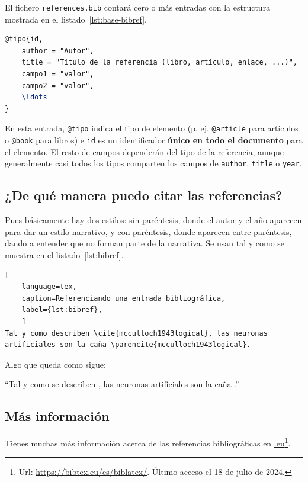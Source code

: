 \documentclass[%
    school=etsisi,%
    type=pfg,%
    degree=61CD,%
]{upm-report}
\begin{document}
El fichero \texttt{references.bib} contará cero o más entradas con la estructura mostrada en el listado~\ref{lst:base-bibref}.

\begin{lstlisting}[language=tex,caption=Estructura general de una referencia,label=lst:base-bibref]
@tipo{id,
    author = "Autor",
    title = "Título de la referencia (libro, artículo, enlace, ...)",
    campo1 = "valor",
    campo2 = "valor",
    \ldots
}
\end{lstlisting}

En esta entrada, \texttt{@tipo} indica el tipo de elemento (p. ej.
\texttt{@article} para artículos o \texttt{@book} para libros) e
\texttt{id} es un identificador \textbf{único en todo el documento} para
el elemento. El resto de campos dependerán del tipo de la referencia,
aunque generalmente casi todos los tipos comparten los campos de
\texttt{author}, \texttt{title} o \texttt{year}.

\subsection{¿De qué manera puedo citar las referencias?}

Pues básicamente hay dos estilos: sin paréntesis, donde el autor y el
año aparecen para dar un estilo narrativo, y con paréntesis, donde
aparecen entre paréntesis, dando a entender que no forman parte de la
narrativa. Se usan tal y como se muestra en el listado~\ref{lst:bibref}.

\begin{lstlisting}[
    language=tex,
    caption=Referenciando una entrada bibliográfica,
    label={lst:bibref},
    ]
Tal y como describen \cite{mcculloch1943logical}, las neuronas
artificiales son la caña \parencite{mcculloch1943logical}.
\end{lstlisting}

Algo que queda como sigue:

\enquote{Tal y como se describen \cite{mcculloch1943logical}, las
neuronas artificiales son la caña \parencite{mcculloch1943logical}.}

\subsection{Más información}

Tienes muchas más información acerca de las referencias bibliográficas
en \href{https://bibtex.eu/es/biblatex/}{.eu}\footnote{
Url: \url{https://bibtex.eu/es/biblatex/}. Último acceso el 18 de julio
de 2024.}.
\end{document}
